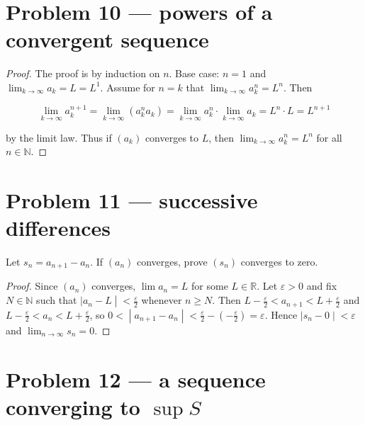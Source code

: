 \section{Problem 10 --- powers of a convergent sequence}

\begin{proof}

The proof is by induction on \(n\). Base case: \(n = 1\) and \(\lim_{k\rightarrow\infty}a_{k} = L = L^{1}\). Assume for \(n = k\) that \(\lim_{k\rightarrow\infty}a_{k}^{n} = L^{n}\). Then

\[\lim\limits_{k\rightarrow\infty}a_{k}^{n + 1} = \lim\limits_{k\rightarrow\infty}\left( {a_{k}^{n}a_{k}} \right) = \lim\limits_{k\rightarrow\infty}a_{k}^{n} \cdot \lim\limits_{k\rightarrow\infty}a_{k} = L^{n} \cdot L = L^{n + 1}\]

by the limit law. Thus if \(\left( a_{k} \right)\) converges to \(L\), then \(\lim_{k\rightarrow\infty}a_{k}^{n} = L^{n}\) for all \(n \in \mathbb{N}\).

\end{proof}

\section{Problem 11 --- successive differences}

Let \(s_{n} = a_{n + 1} - a_{n}\). If \(\left( a_{n} \right)\) converges, prove \(\left( s_{n} \right)\) converges to zero.

\begin{proof}

Since \(\left( a_{n} \right)\) converges, \(\lim a_{n} = L\) for some \(L \in \mathbb{R}\). Let \(\varepsilon > 0\) and fix \(N \in \mathbb{N}\) such that \(\left. |a_{n} - L \middle| < \frac{\varepsilon}{2} \right.\) whenever \(n \geq N\). Then \(L - \frac{\varepsilon}{2} < a_{n + 1} < L + \frac{\varepsilon}{2}\) and \(L - \frac{\varepsilon}{2} < a_{n} < L + \frac{\varepsilon}{2}\), so \(\left. 0 < \middle| a_{n + 1} - a_{n} \middle| < \frac{\varepsilon}{2} - \left( {- \frac{\varepsilon}{2}} \right) = \varepsilon \right.\). Hence \(\left. |s_{n} - 0 \middle| < \varepsilon \right.\) and \(\lim_{n\rightarrow\infty}s_{n} = 0\).

\end{proof}

\section{\texorpdfstring{Problem 12 --- a sequence converging to \(\sup S\)}{Problem 12 --- a sequence converging to \textbackslash sup S}}

